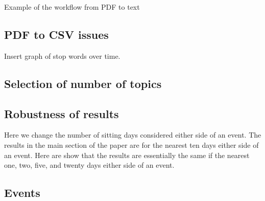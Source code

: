 \documentclass[12pt,]{article}
\theoremstyle{definition}
\theoremstyle{definition}
\theoremstyle{definition}
\theoremstyle{remark}
\begin{document}
Example of the workflow from PDF to text

\subsection{PDF to CSV issues}\label{pdf-to-csv-issues}

Insert graph of stop words over time.

\subsection{Selection of number of
topics}\label{selection-of-number-of-topics}

\subsection{Robustness of results}\label{robustness-of-results}

Here we change the number of sitting days considered either side of an
event. The results in the main section of the paper are for the nearest
ten days either side of an event. Here are show that the results are
essentially the same if the nearest one, two, five, and twenty days
either side of an event.

\subsection{Events}\label{events}
\end{document}
